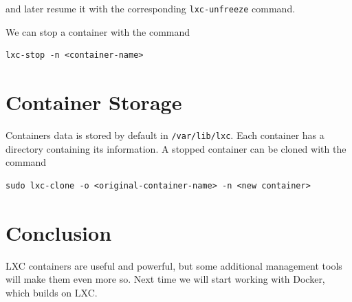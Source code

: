 \documentclass{article}
\begin{document}
and later resume it with the corresponding \texttt{lxc-unfreeze} command.

We can stop a container with the command

\begin{verbatim}
lxc-stop -n <container-name>
\end{verbatim}

\section{Container Storage}
Containers data is stored by default in \texttt{/var/lib/lxc}. Each container has a directory containing its information.  A stopped container can be cloned with the command

\begin{verbatim}
sudo lxc-clone -o <original-container-name> -n <new container>
\end{verbatim}

\section{Conclusion} 
LXC containers are useful and powerful, but some additional management tools will make them even more so. Next time we will start working with Docker, which builds on LXC.
\end{document}
